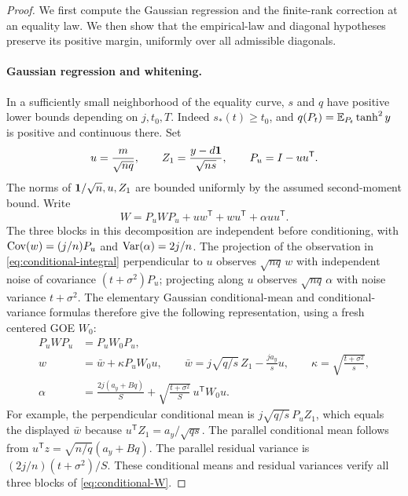 \begin{proof}
We first compute the Gaussian regression and the finite-rank correction
at an equality law. We then show that the empirical-law and diagonal
hypotheses preserve its positive margin, uniformly over all admissible
diagonals.

\paragraph{Gaussian regression and whitening.}
In a sufficiently small neighborhood of the equality curve, $s$ and
$q$ have positive lower bounds depending on $j,t_0,T$.
Indeed $s_*(t)\ge t_0$, and
$q(P_t)=\mathbb E_{P_t}\tanh^2 y$ is positive and continuous there.  Set
\[
 u=\frac{m}{\sqrt{nq}},\qquad
 Z_1=\frac{y-d\mathbf 1}{\sqrt{ns}},\qquad P_u=I-uu^{\mathsf T}.
\]
The norms of $\mathbf 1/\sqrt n,u,Z_1$ are bounded uniformly by the assumed
second-moment bound.  Write
\[
 W=P_uWP_u+uw^{\mathsf T}+wu^{\mathsf T}+\alpha uu^{\mathsf T}.
\]
The three blocks in this decomposition are independent before
conditioning, with $\operatorname{Cov}(w)=(j/n)P_u$ and $\operatorname{Var}(\alpha)=2j/n$.
The projection of the
observation in \eqref{eq:conditional-integral} perpendicular to $u$
observes $\sqrt{nq}\,w$ with independent noise of covariance
$(t+\sigma^2)P_u$; projecting along $u$ observes
$\sqrt{nq}\,\alpha$ with noise variance $t+\sigma^2$.  The elementary
Gaussian conditional-mean and conditional-variance formulas therefore
give the following representation, using a fresh centered GOE $W_0$:
\begin{equation}
 \begin{split}
 P_uWP_u&=P_uW_0P_u,\\
 w&=\bar w+\kappa P_uW_0u,\qquad
 \bar w=j\sqrt{q/s}\,Z_1-\frac{ja_y}{s}u,\qquad
 \kappa=\sqrt{\frac{t+\sigma^2}{s}},\\
 \alpha&=\frac{2j(a_y+Bq)}S
       +\sqrt{\frac{t+\sigma^2}S}\,u^{\mathsf T}W_0u.
 \end{split}
 \label{eq:conditional-W}
\end{equation}
For example, the perpendicular conditional mean is
$j\sqrt{q/s}\,P_uZ_1$, which equals the displayed $\bar w$ because
$u^{\mathsf T}Z_1=a_y/\sqrt{qs}$.  The parallel conditional mean follows
from $u^{\mathsf T}z=\sqrt{n/q}(a_y+Bq)$.  The parallel residual
variance is $(2j/n)(t+\sigma^2)/S$. These conditional means and
residual variances verify all three blocks
of \eqref{eq:conditional-W}.


\end{proof}
